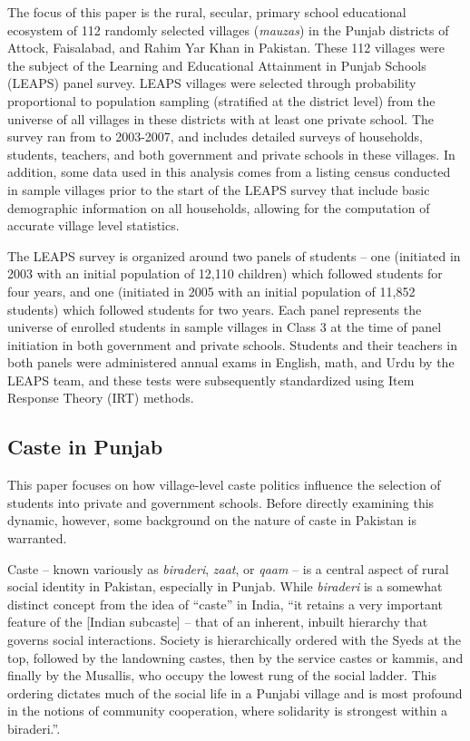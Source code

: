 \documentclass[Eubank_pk_ethnic_sorting.tex]{subfiles}
\begin{document}
The focus of this paper is the rural, secular, primary school educational ecosystem of 112 randomly selected villages (\emph{mauzas}) in the Punjab districts of Attock, Faisalabad, and Rahim Yar Khan in Pakistan. These 112 villages were the subject of the Learning and Educational Attainment in Punjab Schools (LEAPS) panel survey. LEAPS villages were selected through probability proportional to population sampling (stratified at the district level) from the universe of all villages in these districts with at least one private school. The survey ran from to 2003-2007, and includes detailed surveys of households, students, teachers, and both government and private schools in these villages. In addition, some data used in this analysis comes from a listing census conducted in sample villages prior to the start of the LEAPS survey that include basic demographic information on all households, allowing for the computation of accurate village level statistics.

The LEAPS survey is organized around two panels of students -- one (initiated in 2003 with an initial population of 12,110 children) which followed students for four years, and one (initiated in 2005 with an initial population of 11,852 students) which followed students for two years. Each panel represents the universe of enrolled students in sample villages in Class 3 at the time of panel initiation in both government and private schools. Students and their teachers in both panels were administered annual exams in English, math, and Urdu by the LEAPS team, and these tests were subsequently standardized using Item Response Theory (IRT) methods.

\subsection{Caste in Punjab}\label{caste_in_punjab}

This paper focuses on how village-level caste politics influence the selection of students into private and government schools. Before directly examining this dynamic, however, some background on the nature of caste in Pakistan is warranted.

Caste -- known variously as \emph{biraderi}, \emph{zaat}, or \emph{qaam} -- is a central aspect of rural social identity in Pakistan, especially in Punjab. While \emph{biraderi} is a somewhat distinct concept from the idea of ``caste'' in India, ``it retains a very important feature of the [Indian subcaste] -- that of an inherent, inbuilt hierarchy that governs social interactions. Society is hierarchically ordered with the Syeds at the top, followed by the landowning castes, then by the service castes or kammis, and finally by the Musallis, who occupy the lowest rung of the social ladder. This ordering dictates much of the social life in a Punjabi village and is most profound in the notions of community cooperation, where solidarity is strongest within a biraderi.''\citep[p. 29]{Gazdar:2007vt}.
\end{document}
